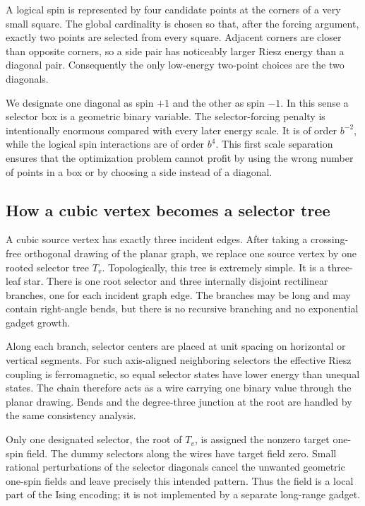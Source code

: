 \documentclass[12pt,a4paper]{article}
\begin{document}
A logical spin is represented by four candidate points at the corners of a very small square.  The global cardinality is chosen so that, after the forcing argument, exactly two points are selected from every square.  Adjacent corners are closer than opposite corners, so a side pair has noticeably larger Riesz energy than a diagonal pair.  Consequently the only low-energy two-point choices are the two diagonals.

We designate one diagonal as spin $+1$ and the other as spin $-1$.  In this sense a selector box is a geometric binary variable.  The selector-forcing penalty is intentionally enormous compared with every later energy scale.  It is of order $b^{-2}$, while the logical spin interactions are of order $b^4$.  This first scale separation ensures that the optimization problem cannot profit by using the wrong number of points in a box or by choosing a side instead of a diagonal.

\subsection*{How a cubic vertex becomes a selector tree}

A cubic source vertex has exactly three incident edges.  After taking a crossing-free orthogonal drawing of the planar graph, we replace one source vertex by one rooted selector tree $T_v$.  Topologically, this tree is extremely simple.  It is a three-leaf star.  There is one root selector and three internally disjoint rectilinear branches, one for each incident graph edge.  The branches may be long and may contain right-angle bends, but there is no recursive branching and no exponential gadget growth.

Along each branch, selector centers are placed at unit spacing on horizontal or vertical segments.  For such axis-aligned neighboring selectors the effective Riesz coupling is ferromagnetic, so equal selector states have lower energy than unequal states.  The chain therefore acts as a wire carrying one binary value through the planar drawing.  Bends and the degree-three junction at the root are handled by the same consistency analysis.

Only one designated selector, the root of $T_v$, is assigned the nonzero target one-spin field.  The dummy selectors along the wires have target field zero.  Small rational perturbations of the selector diagonals cancel the unwanted geometric one-spin fields and leave precisely this intended pattern.  Thus the field is a local part of the Ising encoding; it is not implemented by a separate long-range gadget.
\end{document}
